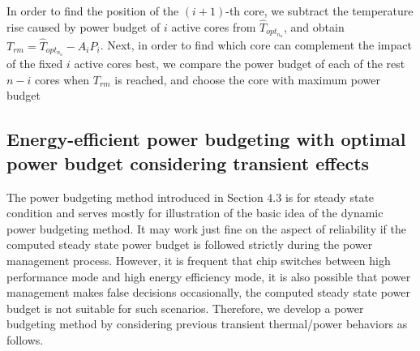 In order to find the position of the $(i+1)$-th core, we subtract the temperature rise caused by power budget of $i$ active cores from $\hat{T}_{opt_{n_{a}}}$, and obtain $T_{rm}=\hat{T}_{opt_{n_{a}}}-A_iP_i$. Next, in order to find which core can complement the impact of the fixed $i$ active cores best, we compare the power budget of each of the rest $n-i$ cores when $T_{rm}$ is reached, and choose the core with maximum power budget






\subsection{Energy-efficient power budgeting with optimal power budget considering transient effects}
The power budgeting method introduced in Section $4.3$ is for steady state condition and serves mostly for illustration of the basic idea of the dynamic power budgeting method. It may work just fine on the aspect of reliability if the computed steady state power budget is followed strictly during the power management process. However, it is frequent that chip switches between high performance mode and high energy efficiency mode, it is also possible that power management makes false decisions occasionally, the computed steady state power budget is not suitable for such scenarios. Therefore, we develop a power budgeting method by considering previous transient thermal/power behaviors as follows.

